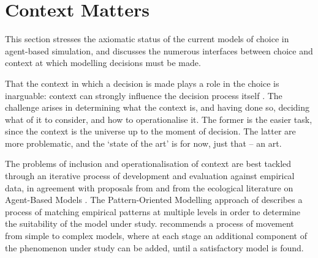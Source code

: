 \documentclass{article}
\begin{document}
\section{Context Matters}
\label{sec:context_matters}

This section stresses the axiomatic status of the current models of choice in agent-based simulation, and discusses the numerous interfaces between choice and context at which modelling decisions must be made.

That the context in which a decision is made plays a role in the choice is inarguable: context can strongly influence the decision process itself \citep{Ben-Akiva2012}. The challenge arises in determining what the context is, and having done so, deciding what of it to consider, and how to operationalise it. The former is the easier task, since the context is the universe up to the moment of decision. The latter are more problematic, and the `state of the art' is for now, just that -- an art. 

The problems of inclusion and operationalisation of context are best tackled through an iterative process of development and evaluation against empirical data, in agreement with proposals from \cite{Cioffi-Revilla2010} and from the ecological literature on Agent-Based Models \citep{Grimm2005, Schmolke2010}. The Pattern-Oriented Modelling approach of \cite{Grimm2005} describes a process of matching empirical patterns at multiple levels in order to determine the suitability of the model under study. \cite{Cioffi-Revilla2010} recommends a process of movement from simple to complex models, where at each stage an additional component of the phenomenon under study can be added, until a satisfactory model is found. 
\end{document}
